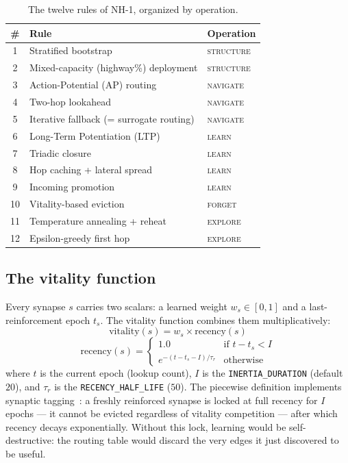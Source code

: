 \documentclass[conference]{IEEEtran}
\newcommand{\nhone}{NH-1\xspace}
\begin{document}
\begin{table}[t]
\centering
\caption{The twelve rules of \nhone, organized by operation.}
\label{tab:rules}
\small
\begin{tabular}{@{}cp{}p{}@{}}
\toprule
\textbf{\#} & \textbf{Rule} & \textbf{Operation} \\
\midrule
1 & Stratified bootstrap & \textsc{structure} \\
2 & Mixed-capacity (highway\%) deployment & \textsc{structure} \\
3 & Action-Potential (AP) routing & \textsc{navigate} \\
4 & Two-hop lookahead & \textsc{navigate} \\
5 & Iterative fallback (= surrogate routing) & \textsc{navigate} \\
6 & Long-Term Potentiation (LTP) & \textsc{learn} \\
7 & Triadic closure & \textsc{learn} \\
8 & Hop caching + lateral spread & \textsc{learn} \\
9 & Incoming promotion & \textsc{learn} \\
10 & Vitality-based eviction & \textsc{forget} \\
11 & Temperature annealing + reheat & \textsc{explore} \\
12 & Epsilon-greedy first hop & \textsc{explore} \\
\bottomrule
\end{tabular}
\end{table}

\subsection{The vitality function}
\label{sec:nh1-vitality}

Every synapse $s$ carries two scalars: a learned weight $w_s \in [0,1]$ and a
last-reinforcement epoch $t_s$. The vitality function combines them
multiplicatively:
\begin{equation}
\mathrm{vitality}(s) = w_s \times \mathrm{recency}(s)
\label{eq:vitality}
\end{equation}
\begin{equation}
\mathrm{recency}(s) =
\begin{cases}
1.0 & \text{if } t - t_s < I \\
e^{-(t - t_s - I)/\tau_r} & \text{otherwise}
\end{cases}
\label{eq:recency}
\end{equation}
where $t$ is the current epoch (lookup count), $I$ is the
\texttt{INERTIA\_DURATION} (default $20$), and $\tau_r$ is the
\texttt{RECENCY\_HALF\_LIFE} ($50$). The piecewise definition implements
synaptic tagging~\cite{frey1997synaptic}: a freshly reinforced synapse is
locked at full recency for $I$ epochs --- it cannot be evicted regardless of
vitality competition --- after which recency decays exponentially. Without
this lock, learning would be self-destructive: the routing table would
discard the very edges it just discovered to be useful.
\end{document}
